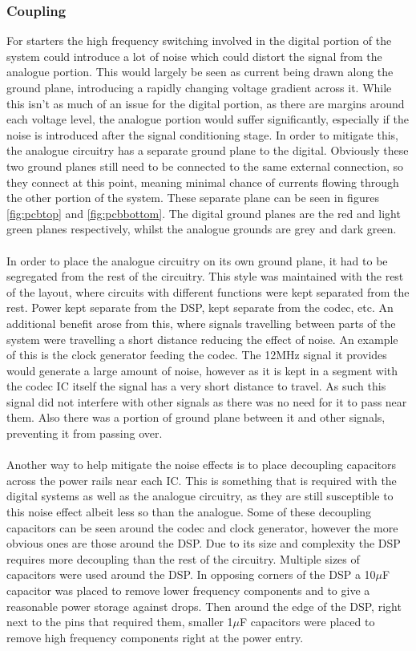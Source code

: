 \subsubsection{Coupling}
For starters the high frequency switching involved in the digital portion of the system could introduce a lot of noise which could distort the signal from the analogue portion.
This would largely be seen as current being drawn along the ground plane, introducing a rapidly changing voltage gradient across it.
While this isn't as much of an issue for the digital portion, as there are margins around each voltage level, the analogue portion would suffer significantly, especially if the noise is introduced after the signal conditioning stage.
In order to mitigate this, the analogue circuitry has a separate ground plane to the digital.
Obviously these two ground planes still need to be connected to the same external connection, so they connect at this point, meaning minimal chance of currents flowing through the other portion of the system.
These separate plane can be seen in figures \ref{fig:pcbtop} and \ref{fig:pcbbottom}.
The digital ground planes are the red and light green planes respectively, whilst the analogue grounds are grey and dark green.
\\
\\
In order to place the analogue circuitry on its own ground plane, it had to be segregated from the rest of the circuitry.
This style was maintained with the rest of the layout, where circuits with different functions were kept separated from the rest.
Power kept separate from the DSP, kept separate from the codec, etc.
An additional benefit arose from this, where signals travelling between parts of the system were travelling a short distance reducing the effect of noise.
An example of this is the clock generator feeding the codec.
The 12MHz signal it provides would generate a large amount of noise, however as it is kept in a segment with the codec IC itself the signal has a very short distance to travel.
As such this signal did not interfere with other signals as there was no need for it to pass near them.
Also there was a portion of ground plane between it and other signals, preventing it from passing over.
\\
\\
Another way to help mitigate the noise effects is to place decoupling capacitors across the power rails near each IC.
This is something that is required with the digital systems as well as the analogue circuitry, as they are still susceptible to this noise effect albeit less so than the analogue.
Some of these decoupling capacitors can be seen around the codec and clock generator, however the more obvious ones are those around the DSP.
Due to its size and complexity the DSP requires more decoupling than the rest of the circuitry.
Multiple sizes of capacitors were used around the DSP.
In opposing corners of the DSP a 10$\mu$F capacitor was placed to remove lower frequency components and to give a reasonable power storage against drops.
Then around the edge of the DSP, right next to the pins that required them, smaller 1$\mu$F capacitors were placed to remove high frequency components right at the power entry.


